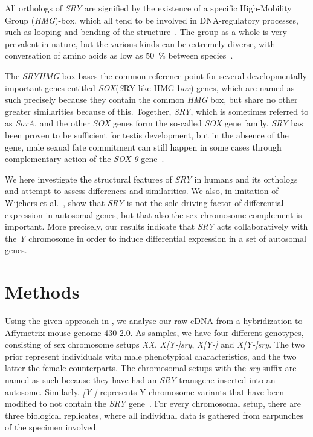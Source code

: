 \documentclass[10pt, twocolumn]{article}\usepackage[]{graphicx}\usepackage[]{color}
\theoremstyle{plain}
\newcommand{\SRY}{\textit{SRY}\xspace}
\newcommand{\HMG}{\textit{HMG}\xspace}
\newcommand{\SOX}{\textit{SOX}\xspace}
\newcommand{\XX}{\textit{XX}\xspace}
\newcommand{\XY}{\textit{X[Y-]}\xspace}
\newcommand{\XYSRY}{\textit{X[Y-]sry}\xspace}
\begin{document}
All orthologs of \SRY are signified by the existence of a specific High-Mobility Group (\HMG)-box, which all tend to be involved in DNA-regulatory processes, such as looping and bending of the structure~\cite{evolsry}. The group as a whole is very prevalent in nature, but the various kinds can be extremely diverse, with conversation of amino acids as low as 50~\% between species~\cite{hmgconserved}. 

The \SRY \HMG-box bases the common reference point for several developmentally important genes entitled \SOX (\textit{S}RY-like HMG-b\textit{ox}) genes, which are named as such precisely because they contain the common \HMG box, but share no other greater similarities because of this. Together, \SRY, which is sometimes referred to as \textit{SoxA}, and the other \SOX genes form the so-called \SOX gene family. \SRY has been proven to be sufficient for testis development, but in the absence of the gene, male sexual fate commitment can still happen in some cases through complementary action of the \SOX-\textit{9} gene~\cite{soximportance,sox9}. 

We here investigate the structural features of \SRY in humans and its orthologs and attempt to assess differences and similarities. We also, in imitation of Wijchers et al.~\cite{complement}, show that \SRY is not the sole driving factor of differential expression in autosomal genes, but that also the sex chromosome complement is important. More precisely, our results indicate that \SRY acts collaboratively with the \textit{Y} chromosome in order to induce differential expression in a set of autosomal genes.

\section*{Methods}
Using the given approach in \cite{complement}, we analyse our raw cDNA from a hybridization to Affymetrix mouse genome 430 2.0. As samples, we have four different genotypes, consisting of sex chromosome setups \XX, \XYSRY, \XY and \XYSRY. The two prior represent individuals with  male phenotypical characteristics, and the two latter the female counterparts. The chromosomal setups with the \textit{sry} suffix are named as such because they have had an \SRY transgene inserted into an autosome. Similarly, \textit{[Y-]} represents Y chromosome variants that have been modified to not contain the \SRY gene~\cite{y-}. For every chromosomal setup, there are three biological replicates, where all individual data is gathered from earpunches of the specimen involved. 
\end{document}
